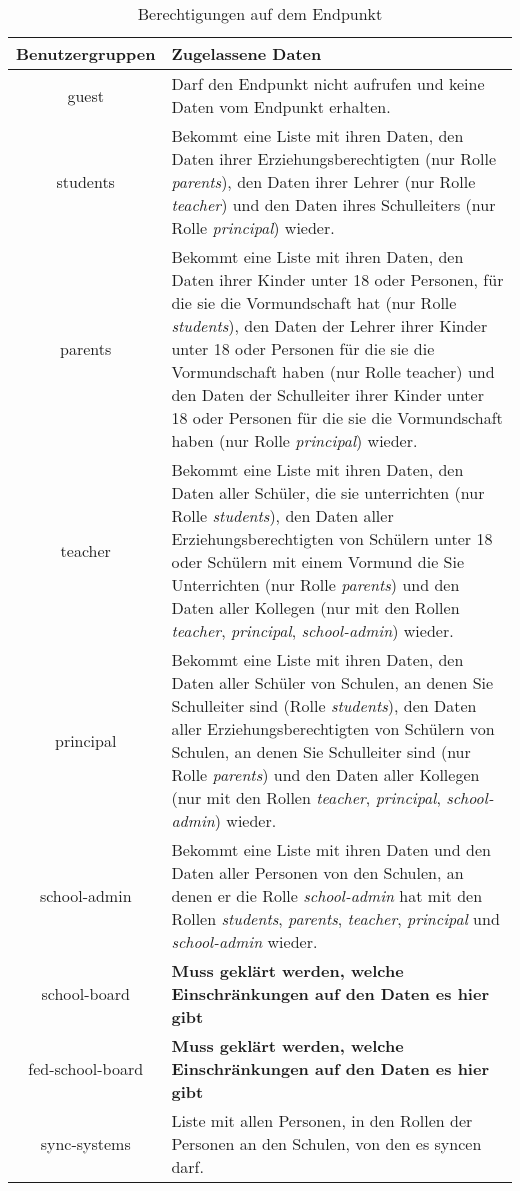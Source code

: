 \begin{table}[htb]
	\begin{tabularx}{\textwidth}{|c|X|}
		\hline
\textbf{Benutzergruppen} & \textbf{Zugelassene Daten} \\ \hline
guest & Darf den Endpunkt nicht aufrufen und keine Daten vom Endpunkt erhalten. \\ \hline
students & Bekommt eine Liste mit ihren Daten, 
           den Daten ihrer Erziehungsberechtigten (nur Rolle \textit{parents}), 
					 den Daten ihrer Lehrer (nur Rolle \textit{teacher}) und 
					 den Daten ihres Schulleiters (nur Rolle \textit{principal}) wieder.\\ \hline
parents & Bekommt eine Liste mit ihren Daten, 
          den Daten ihrer Kinder unter 18 oder Personen, für die sie die Vormundschaft hat (nur Rolle \textit{students}), 
					den Daten der Lehrer ihrer Kinder unter 18 oder Personen für die sie die Vormundschaft haben (nur Rolle teacher) und
					den Daten der Schulleiter ihrer Kinder unter 18 oder Personen für die sie die Vormundschaft haben (nur Rolle \textit{principal})
					wieder.\\ \hline
teacher & Bekommt eine Liste mit ihren Daten, 
          den Daten aller Schüler, die sie unterrichten (nur Rolle \textit{students}),
					den Daten aller Erziehungsberechtigten von Schülern unter 18 oder Schülern mit einem Vormund die Sie Unterrichten (nur Rolle \textit{parents}) und
					den Daten aller Kollegen (nur mit den Rollen \textit{teacher}, \textit{principal}, \textit{school-admin}) 
					wieder.\\ \hline
principal & Bekommt eine Liste mit ihren Daten,
            den Daten aller Schüler von Schulen, an denen Sie Schulleiter sind (Rolle \textit{students}),
						den Daten aller Erziehungsberechtigten von Schülern von Schulen, an denen Sie Schulleiter sind (nur Rolle \textit{parents}) und
					  den Daten aller Kollegen (nur mit den Rollen \textit{teacher}, \textit{principal}, \textit{school-admin})
						wieder.\\ \hline
school-admin & Bekommt eine Liste mit ihren Daten und
               den Daten aller Personen von den Schulen, an denen er die Rolle \textit{school-admin} hat mit den Rollen \textit{students}, \textit{parents}, \textit{teacher}, \textit{principal} und \textit{school-admin} wieder.  \\ \hline
school-board & \textcolor[rgb]{1,0.41,0.13}{\textbf{Muss geklärt werden, welche Einschränkungen auf den Daten es hier gibt}} \\ \hline
fed-school-board & \textcolor[rgb]{1,0.41,0.13}{\textbf{Muss geklärt werden, welche Einschränkungen auf den Daten es hier gibt}} \\ \hline
sync-systems & Liste mit allen Personen, in den Rollen der Personen an den Schulen, von den es syncen darf. \\ \hline

	\end{tabularx}

		\caption{Berechtigungen auf dem Endpunkt}
		\label{tab:end:rest:api:school:users:read:right}
\end{table}